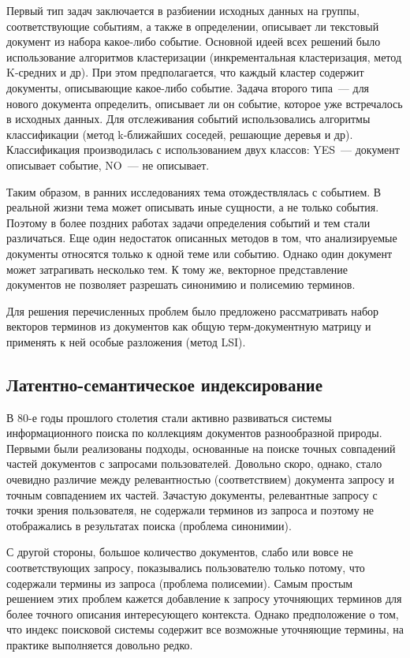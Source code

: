 Первый тип задач заключается в разбиении исходных данных на группы, соответствующие событиям, а также в определении, описывает ли текстовый документ из набора какое-либо событие. Основной идеей всех решений было использование алгоритмов кластеризации (инкрементальная кластеризация, метод K-средних и др). При этом предполагается, что каждый кластер содержит документы, описывающие какое-либо событие. Задача второго типа~--- для нового документа определить, описывает ли он событие, которое уже встречалось в исходных данных. Для отслеживания событий использовались алгоритмы классификации (метод k-ближайших соседей, решающие деревья и др). Классификация производилась с использованием двух классов: YES~--- документ описывает событие, NO~--- не описывает.
 
Таким образом, в ранних исследованиях тема отождествлялась с событием. В реальной жизни тема может описывать иные сущности, а не только события. Поэтому в более поздних работах задачи определения событий и тем стали различаться. Еще один недостаток описанных методов в том, что анализируемые документы относятся только к одной теме или событию. Однако один документ может затрагивать несколько тем. К тому же, векторное представление документов не позволяет разрешать синонимию и полисемию терминов. 

Для решения перечисленных проблем было предложено рассматривать набор векторов терминов из документов как общую терм-документную матрицу и применять к ней особые разложения (метод LSI).


\subsection{Латентно-семантическое индексирование}

В 80-е годы прошлого столетия стали активно развиваться системы информационного поиска по коллекциям документов разнообразной природы. Первыми были реализованы подходы, основанные на поиске точных совпадений частей документов с запросами пользователей. Довольно скоро, однако, стало очевидно различие между релевантностью (соответствием) документа запросу и точным совпадением их частей. Зачастую документы, релевантные запросу с точки зрения пользователя, не содержали терминов из запроса и поэтому не отображались в результатах поиска (проблема синонимии). 

С другой стороны, большое количество документов, слабо или вовсе не соответствующих запросу, показывались пользователю только потому, что содержали термины из запроса (проблема полисемии). Самым простым решением этих проблем кажется добавление к запросу уточняющих терминов для более точного описания интересующего контекста. Однако предположение о том, что индекс поисковой системы содержит все возможные уточняющие термины, на практике выполняется довольно редко. 

